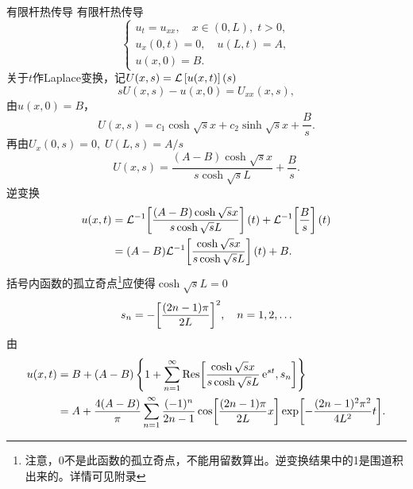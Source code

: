 \begin{example}{有限杆热传导}{}
	有限杆热传导
	\[
		\begin{cases}
			u_t=u_{xx},\quad x\in(0,L),\;t>0,     \\
			u_x(0,t)=0,\quad u(L,t)=A, \\
			u(x,0)=B.
		\end{cases}
	\]
	关于$t$作Laplace变换，记$U(x,s)=\mathcal L\left[u(x,t)\right](s)$
	\[
		s U(x,s)-u(x,0)=U_{xx}(x,s),
	\]
	由$u(x,0)=B$，
	\[
		U(x,s)=c_1\cosh\sqrt s x+c_2\sinh\sqrt s x+\frac Bs.
	\]
	再由$U_x(0,s)=0,\;U(L,s)=A/s$
	\[
		U(x,s)=\frac{(A-B)\cosh\sqrt s x}{s\cosh\sqrt s L}+\frac Bs.
	\]
	逆变换
	\begin{align*}
		u(x,t)&=\mathcal L^{-1}\!\left[\frac{(A-B)\cosh\sqrt s x}{s\cosh\sqrt s L}\right](t)+\mathcal L^{-1}\!\left[\frac Bs\right](t)\\
		&=(A-B)\mathcal L^{-1}\!\left[\frac{\cosh\sqrt s x}{s\cosh\sqrt s L}\right](t)+B.
	\end{align*}
	括号内函数的孤立奇点\footnote{注意，0不是此函数的孤立奇点，不能用留数算出。逆变换结果中的1是围道积出来的。详情可见附录}应使得$\cosh\sqrt s L=0$
	\[
		s_n=-\biggl[\frac{(2n-1)\pi}{2L}\biggr]^2,\quad n=1,2,\ldots
	\]
	由
	{\small\begin{align*}
		u(x,t)&=B+(A-B)\left\{1+\sum_{n=1}^{\infty}\operatorname{Res}\biggl[\frac{\cosh\sqrt s x}{s\cosh\sqrt s L}\mathop{}\!\mathrm{e}^{s t},s_n\biggr]\right\}\\
		&=A+\frac{4(A-B)}\pi\sum_{n=1}^{\infty}\frac{(-1)^n}{2n-1}\cos\biggl[\frac{(2n-1)\pi}{2L}x\biggr]\exp\biggl[-\frac{(2n-1)^2\pi^2}{4L^2}t\biggr].
	\end{align*}}
\end{example}
